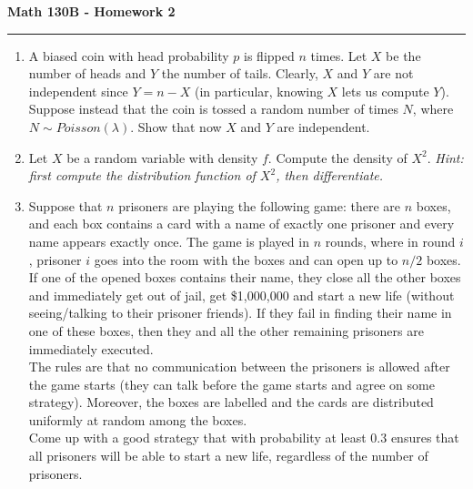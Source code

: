 \documentclass[11pt,letterpaper]{report}
\begin{document}
\begin{center}
{\bf \Large Math 130B - Homework 2}
\vspace{0.2cm}
\hrule
\end{center}

\begin{enumerate}
	\item A biased coin with head probability $p$ is flipped $n$ times. Let $X$ be the number of heads and $Y$ the number of tails. Clearly, $X$ and $Y$ are not independent since $Y = n-X$ (in particular, knowing $X$ lets us compute $Y$). Suppose instead that the coin is tossed a random number of times $N$, where $N\sim Poisson(\lambda)$. Show that now $X$ and $Y$ are independent.

	\item Let $X$ be a random variable with density $f$. Compute the density of $X^2$. \textit{Hint: first compute the distribution function of $X^2$, then differentiate.}

	\item Suppose that $n$ prisoners are playing the following game: there are $n$ boxes, and each box contains a card with a name of exactly one prisoner and every name appears exactly once. The game is played in $n$ rounds, where in round $i$, prisoner $i$ goes into the room with the boxes and can open up to $n/2$ boxes. If one of the opened boxes contains their name, they close all the other boxes and immediately get out of jail, get \$1,000,000 and start a new life (without seeing/talking to their prisoner friends).  If they fail in finding their name in one of these boxes, then they and all the other remaining prisoners are immediately executed.\\

	The rules are that no communication between the prisoners is allowed after the game starts (they can talk before the game starts and agree on some strategy). Moreover, the boxes are labelled and the cards are distributed uniformly at random among the boxes.\\

	Come up with a good strategy that with probability at least $0.3$ ensures that all prisoners will be able to start a new life, regardless of the number of prisoners.


\end{enumerate}
\end{document}
